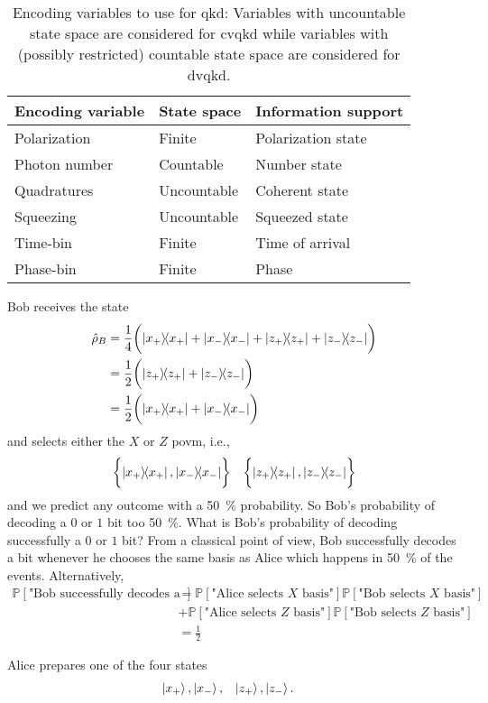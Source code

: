\begin{table}[htb]
	\centering
	\begin{tabular}{lll}
		\toprule
		Encoding variable & State space & Information support \\
		\midrule
		Polarization & Finite & Polarization state \\
		Photon number & Countable & Number state \\
		Quadratures & Uncountable & Coherent state \\
		Squeezing & Uncountable & Squeezed state \\
		Time-bin & Finite & Time of arrival \\
		Phase-bin & Finite & Phase \\
		\bottomrule
	\end{tabular}
	\caption{Encoding variables to use for \gls{qkd}: Variables with uncountable state space are considered for \gls{cvqkd} while variables with (possibly restricted) countable state space are considered for \gls{dvqkd}.}
\end{table}

Bob receives the state
\begin{equation*}
	\begin{split}
		\hat\rho_B
		&=
		\frac{1}{4}
		\biggl(
			\ketbra{x_+}
			+
			\ketbra{x_-}
			+
			\ketbra{z_+}
			+
			\ketbra{z_-}
		\biggr)
		\\
		&=
		\frac{1}{2}
		\biggl(
			\ketbra{z_+}
			+
			\ketbra{z_-}
		\biggr)
		\\
		&=
		\frac{1}{2}
		\biggl(
			\ketbra{x_+}
			+
			\ketbra{x_-}
		\biggr)
	\end{split}
\end{equation*}
and selects either the $X$ or $Z$ \gls{povm}, i.e.,
\begin{align}
	\biggl\{
		\ketbra{x_+},
		\ketbra{x_-}
	\biggr\}
	&&
	\biggl\{
		\ketbra{z_+},
		\ketbra{z_-}
	\biggr\}
\end{align}
and we predict any outcome with a \SI{50}{\percent} probability.
So Bob's probability of decoding a $0$ or $1$ bit too \SI{50}{\percent}.
What is Bob's probability of decoding successfully a $0$ or $1$ bit?
From a classical point of view, Bob successfully decodes a bit whenever he chooses the same basis as Alice which happens in \SI{50}{\percent} of the events.
Alternatively,
\begin{equation}
	\begin{split}
		\mathbb{P}\left[\text{"Bob successfully decodes a bit"}\right]
		&=
		\mathbb{P}\left[\text{"Alice selects $X$ basis"}\right]
		\mathbb{P}\left[\text{"Bob selects $X$ basis"}\right]
		\\
		&+
		\mathbb{P}\left[\text{"Alice selects $Z$ basis"}\right]
		\mathbb{P}\left[\text{"Bob selects $Z$ basis"}\right]
		\\
		&=
		\frac{1}{2}
	\end{split}
\end{equation}

Alice prepares one of the four states
\begin{align}
	\ket{x_+},
	&
	\ket{x_-},
	&
	\ket{z_+},
	&
	\ket{z_-}.
\end{align}